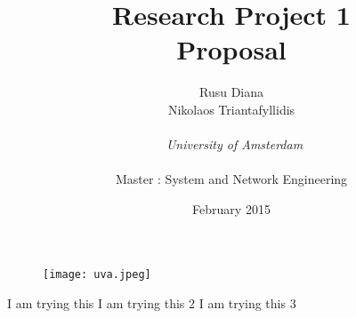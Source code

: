\documentclass[11pt]{report}
\begin{document}
\begin{figure}[!t]
\centering
\texttt{[image: uva.jpeg]}
\end{figure}
\title{\textbf{Research Project 1 
} \\ Proposal}
\author{Rusu Diana \\ Nikolaos Triantafyllidis\\ \\
~\emph{University of Amsterdam 
        } \\ \\Master : System and Network Engineering}


\date{February 2015}

\maketitle

\tableofcontents




\begin{thebibliography}{1}
  I am trying this 
  I am trying this 2 
  I am trying this 3
\end{thebibliography}
\end{document}

